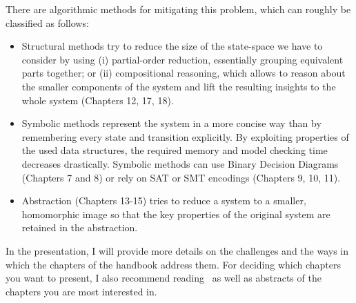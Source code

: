 \documentclass[11pt]{article}
\begin{document}
There are algorithmic methods for mitigating this problem, which can roughly be classified as follows:
\begin{itemize}
	\item Structural methods try to reduce the size of the state-space we have to consider by using (i) partial-order reduction, essentially grouping equivalent parts together; or (ii) compositional reasoning, which allows to reason about the smaller components of the system and lift the resulting insights to the whole system (Chapters 12, 17, 18).
	\item Symbolic methods represent the system in a more concise way than by remembering every state and transition explicitly. By exploiting properties of the used data structures, the required memory and model checking time decreases drastically. Symbolic methods can use Binary Decision Diagrams (Chapters 7 and 8) or rely on SAT or SMT encodings (Chapters 9, 10, 11).
	\item Abstraction (Chapters 13-15) tries to reduce a system to a smaller, homomorphic image so that the key properties of the original system are retained in the abstraction.
\end{itemize}

In the presentation, I will provide more details on the challenges and the ways in which the chapters of the handbook address them.
For deciding which chapters you want to present, I also recommend reading~\cite[Chapter 1.3]{handbook} as well as abstracts of the chapters you are most interested in.




\end{document}
